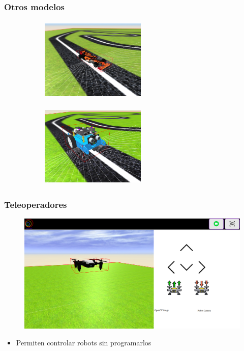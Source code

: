 \documentclass[xcolor={table}]{beamer}
\begin{document}
		\begin{frame}
			\frametitle{Otros modelos}
		\begin{figure}[H]
        \centering
        \begin{subfigure}{\textwidth}
         \includegraphics[width=5cm, height=4cm]{img/f1_renault.png}
   \label{fig:f1renault}
        \end{subfigure}
        \begin{subfigure}{\textwidth}
         \includegraphics[width=5cm, height=4cm]{img/mBot_model.png}
   \label{fig:mbot}
        \end{subfigure}
        \end{figure}
		\end{frame}
		
		\begin{frame}
		\frametitle{Teleoperadores}
    		\begin{figure}{\textwidth}
    		\centering
             \includegraphics[scale=0.2]{img/drone_teleoperator.png}
             \label{fig:teleopdrone}
            \end{figure}
            	\begin{itemize}
    		    	\item \Large{Permiten controlar robots sin programarlos}
		    \end{itemize}
		\end{frame}
		
\end{document}
